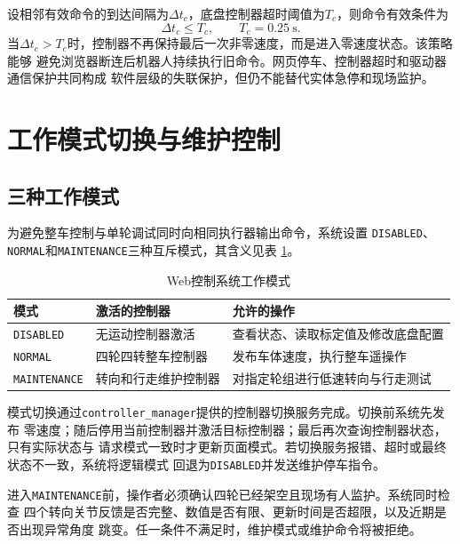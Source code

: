 \documentclass[UTF8,12pt,a4paper,openany]{ctexbook}
\begin{document}
设相邻有效命令的到达间隔为$\Delta t_c$，底盘控制器超时阈值为$T_c$，则命令有效条件为
\begin{equation}
    \Delta t_c \leq T_c,
    \qquad T_c=0.25~\mathrm{s}.
    \label{eq:web-command-timeout}
\end{equation}
当$\Delta t_c>T_c$时，控制器不再保持最后一次非零速度，而是进入零速度状态。该策略能够
避免浏览器断连后机器人持续执行旧命令。网页停车、控制器超时和驱动器通信保护共同构成
软件层级的失联保护，但仍不能替代实体急停和现场监护。

\section{工作模式切换与维护控制}

\subsection{三种工作模式}

为避免整车控制与单轮调试同时向相同执行器输出命令，系统设置
\texttt{DISABLED}、\texttt{NORMAL}和\texttt{MAINTENANCE}三种互斥模式，其含义见表
\ref{tab:web-modes}。

\begin{table}[htbp]
    \centering
    \caption{Web控制系统工作模式}
    \label{tab:web-modes}
    \begin{tabularx}{\textwidth}{p{3.1cm}p{4.1cm}X}
        \toprule
        模式 & 激活的控制器 & 允许的操作 \\
        \midrule
        \texttt{DISABLED} & 无运动控制器激活 & 查看状态、读取标定值及修改底盘配置 \\
        \texttt{NORMAL} & 四轮四转整车控制器 & 发布车体速度，执行整车遥操作 \\
        \texttt{MAINTENANCE} & 转向和行走维护控制器 & 对指定轮组进行低速转向与行走测试 \\
        \bottomrule
    \end{tabularx}
\end{table}

模式切换通过\texttt{controller\_manager}提供的控制器切换服务完成。切换前系统先发布
零速度；随后停用当前控制器并激活目标控制器；最后再次查询控制器状态，只有实际状态与
请求模式一致时才更新页面模式。若切换服务报错、超时或最终状态不一致，系统将逻辑模式
回退为\texttt{DISABLED}并发送维护停车指令。

进入\texttt{MAINTENANCE}前，操作者必须确认四轮已经架空且现场有人监护。系统同时检查
四个转向关节反馈是否完整、数值是否有限、更新时间是否超限，以及近期是否出现异常角度
跳变。任一条件不满足时，维护模式或维护命令将被拒绝。
\end{document}
